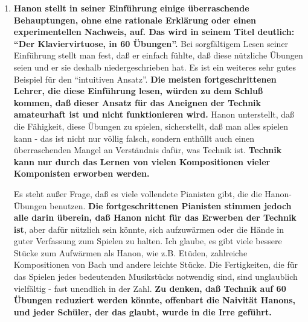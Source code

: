 \begin{enumerate}[label={\roman*.}]  

\item \hypertarget{c1iii7h1}{}\textbf{Hanon stellt in seiner Einführung einige überraschende Behauptungen, ohne eine rationale Erklärung oder einen experimentellen Nachweis, auf.
Das wird in seinem Titel deutlich: \enquote{Der Klaviervirtuose, in 60 Übungen}.}
Bei sorgfältigem Lesen seiner Einführung stellt man fest, daß er einfach fühlte, daß diese nützliche Übungen seien und er sie deshalb niedergeschrieben hat.
Es ist ein weiteres sehr gutes Beispiel für den \enquote{intuitiven Ansatz}.
\textbf{Die meisten fortgeschrittenen Lehrer, die diese Einführung lesen, würden zu dem Schluß kommen, daß dieser Ansatz für das Aneignen der Technik amateurhaft ist und nicht funktionieren wird.}
Hanon unterstellt, daß die Fähigkeit, diese Übungen zu spielen, sicherstellt, daß man alles spielen kann - das ist nicht nur völlig falsch, sondern enthüllt auch einen überraschenden Mangel an Verständnis dafür, was Technik ist.
\textbf{Technik kann nur durch das Lernen von vielen Kompositionen vieler Komponisten erworben werden.}

Es steht außer Frage, daß es viele vollendete Pianisten gibt, die die Hanon-Übungen benutzen.
\textbf{Die fortgeschrittenen Pianisten stimmen jedoch alle darin überein, daß Hanon nicht für das Erwerben der Technik ist}, aber dafür nützlich sein könnte, sich aufzuwärmen oder die Hände in guter Verfassung zum Spielen zu halten.
Ich glaube, es gibt viele bessere Stücke zum Aufwärmen als Hanon, wie z.B. Etüden, zahlreiche Kompositionen von Bach und andere leichte Stücke.
Die Fertigkeiten, die für das Spielen jedes bedeutenden Musikstücks notwendig sind, sind unglaublich vielfältig - fast unendlich in der Zahl.
\textbf{Zu denken, daß Technik auf 60 Übungen reduziert werden könnte, offenbart die Naivität Hanons, und jeder Schüler, der das glaubt, wurde in die Irre geführt.}




\end{enumerate}
